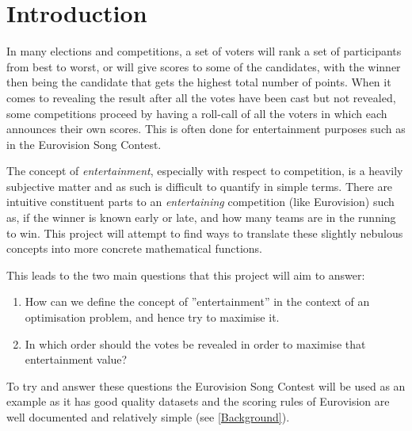 \documentclass[12pt]{report}
\begin{document}
\section{Introduction}\label{Introduction}
In many elections and competitions, a set of voters will rank a set of participants from best to worst, or will give scores to some of the candidates, with the winner then being the candidate that gets the highest total number of points. When it comes to revealing the result after all the votes have been cast but not revealed, some competitions proceed by having a roll-call of all the voters in which each announces their own scores. This is often done for entertainment purposes such as in the Eurovision Song Contest.\cite{EurovisionVoting}

The concept of \textit{entertainment}, especially with respect to competition, is a heavily subjective matter and as such is difficult to quantify in simple terms. There are intuitive constituent parts to an \textit{entertaining} competition (like Eurovision) such as, if the winner is known early or late, and how many teams are in the running to win. This project will attempt to find ways to translate these slightly nebulous concepts into more concrete mathematical functions.  

This leads to the two main questions that this project will aim to answer:

\begin{enumerate}
\item How can we define the concept of ''entertainment'' in the context of an optimisation problem, and hence try to maximise it.
\item  In which order should the votes be revealed in order to maximise that entertainment value?
\end{enumerate}

To try and answer these questions the Eurovision Song Contest will be used as an example as it has good quality datasets and the scoring rules of Eurovision are well documented and relatively simple (see \ref{Background}).
\end{document}
